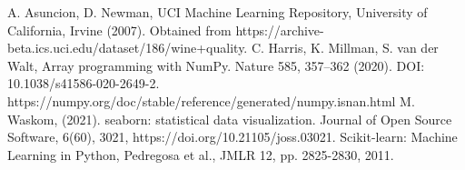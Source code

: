 \documentclass[titlepage]{article}
\begin{document}
	
\begin{thebibliography}{9}
	 A. Asuncion, D. Newman, UCI Machine Learning Repository, University of California, Irvine  (2007).  Obtained from https://archive-beta.ics.uci.edu/dataset/186/wine+quality. 
	 C. Harris, K. Millman, S. van der Walt,  Array programming with NumPy. Nature 585, 357–362 (2020). DOI: 10.1038/s41586-020-2649-2.  https://numpy.org/doc/stable/reference/generated/numpy.isnan.html
	 M. Waskom, (2021). seaborn: statistical data visualization. Journal of Open Source Software, 6(60), 3021, https://doi.org/10.21105/joss.03021.
	Scikit-learn: Machine Learning in Python, Pedregosa et al., JMLR 12, pp. 2825-2830, 2011. 
\end{thebibliography}
\end{document}

